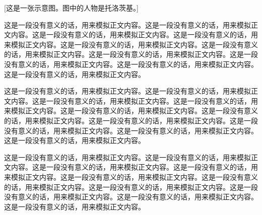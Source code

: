 [这是一张示意图。图中的人物是托洛茨基。]

这是一段没有意义的话，用来模拟正文内容。这是一段没有意义的话，用来模拟正文内容。这是一段没有意义的话，用来模拟正文内容。这是一段没有意义的话，用来模拟正文内容。这是一段没有意义的话，用来模拟正文内容。这是一段没有意义的话，用来模拟正文内容。这是一段没有意义的话，用来模拟正文内容。这是一段没有意义的话，用来模拟正文内容。这是一段没有意义的话，用来模拟正文内容。这是一段没有意义的话，用来模拟正文内容。


这是一段没有意义的话，用来模拟正文内容。这是一段没有意义的话，用来模拟正文内容。这是一段没有意义的话，用来模拟正文内容。这是一段没有意义的话，用来模拟正文内容。这是一段没有意义的话，用来模拟正文内容。这是一段没有意义的话，用来模拟正文内容。这是一段没有意义的话，用来模拟正文内容。这是一段没有意义的话，用来模拟正文内容。这是一段没有意义的话，用来模拟正文内容。这是一段没有意义的话，用来模拟正文内容。

\todo{}

这是一段没有意义的话，用来模拟正文内容。这是一段没有意义的话，用来模拟正文内容。这是一段没有意义的话，用来模拟正文内容。这是一段没有意义的话，用来模拟正文内容。这是一段没有意义的话，用来模拟正文内容。这是一段没有意义的话，用来模拟正文内容。这是一段没有意义的话，用来模拟正文内容。这是一段没有意义的话，用来模拟正文内容。这是一段没有意义的话，用来模拟正文内容。这是一段没有意义的话，用来模拟正文内容。

